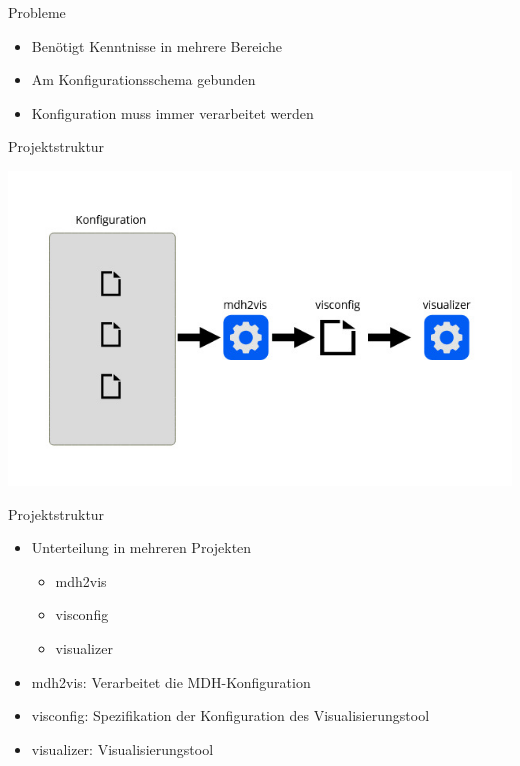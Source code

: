 \documentclass{presentation}
\begin{document}
\begin{frame}{Probleme}
    \begin{itemize}
        \item Benötigt Kenntnisse in mehrere Bereiche
        \item Am Konfigurationsschema gebunden
        \item Konfiguration muss immer verarbeitet werden
    \end{itemize}
\end{frame}

\begin{frame}{Projektstruktur}
    \begin{center}
        \includegraphics[width=\textwidth]{struktur_entwurf_2.jpg}
    \end{center}
\end{frame}

\begin{frame}{Projektstruktur}
    \begin{itemize}
        \item Unterteilung in mehreren Projekten
            \begin{itemize}
                \item mdh2vis
                \item visconfig
                \item visualizer
            \end{itemize}

        \item mdh2vis: Verarbeitet die MDH-Konfiguration
        \item visconfig: Spezifikation der Konfiguration des Visualisierungstool
        \item visualizer: Visualisierungstool
    \end{itemize}
\end{frame}
\end{document}
